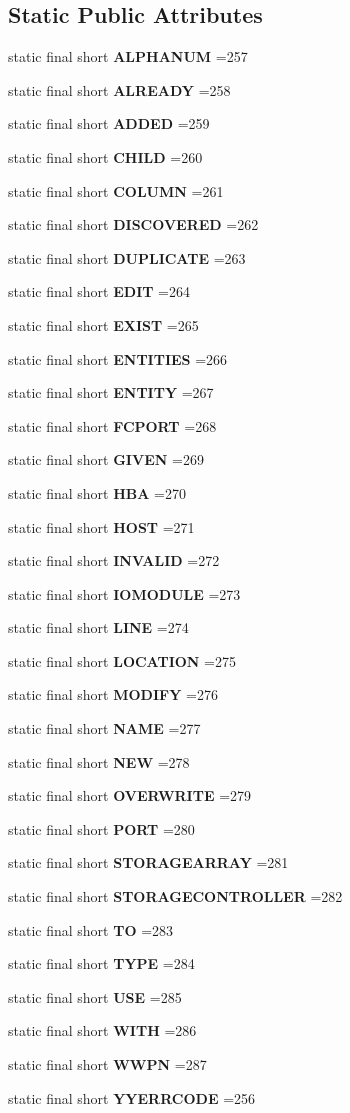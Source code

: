 \subsection*{Static Public Attributes}
\begin{DoxyCompactItemize}
\item 
static final short {\bf A\+L\+P\+H\+A\+N\+U\+M} =257
\item 
static final short {\bf A\+L\+R\+E\+A\+D\+Y} =258
\item 
static final short {\bf A\+D\+D\+E\+D} =259
\item 
static final short {\bf C\+H\+I\+L\+D} =260
\item 
static final short {\bf C\+O\+L\+U\+M\+N} =261
\item 
static final short {\bf D\+I\+S\+C\+O\+V\+E\+R\+E\+D} =262
\item 
static final short {\bf D\+U\+P\+L\+I\+C\+A\+T\+E} =263
\item 
static final short {\bf E\+D\+I\+T} =264
\item 
static final short {\bf E\+X\+I\+S\+T} =265
\item 
static final short {\bf E\+N\+T\+I\+T\+I\+E\+S} =266
\item 
static final short {\bf E\+N\+T\+I\+T\+Y} =267
\item 
static final short {\bf F\+C\+P\+O\+R\+T} =268
\item 
static final short {\bf G\+I\+V\+E\+N} =269
\item 
static final short {\bf H\+B\+A} =270
\item 
static final short {\bf H\+O\+S\+T} =271
\item 
static final short {\bf I\+N\+V\+A\+L\+I\+D} =272
\item 
static final short {\bf I\+O\+M\+O\+D\+U\+L\+E} =273
\item 
static final short {\bf L\+I\+N\+E} =274
\item 
static final short {\bf L\+O\+C\+A\+T\+I\+O\+N} =275
\item 
static final short {\bf M\+O\+D\+I\+F\+Y} =276
\item 
static final short {\bf N\+A\+M\+E} =277
\item 
static final short {\bf N\+E\+W} =278
\item 
static final short {\bf O\+V\+E\+R\+W\+R\+I\+T\+E} =279
\item 
static final short {\bf P\+O\+R\+T} =280
\item 
static final short {\bf S\+T\+O\+R\+A\+G\+E\+A\+R\+R\+A\+Y} =281
\item 
static final short {\bf S\+T\+O\+R\+A\+G\+E\+C\+O\+N\+T\+R\+O\+L\+L\+E\+R} =282
\item 
static final short {\bf T\+O} =283
\item 
static final short {\bf T\+Y\+P\+E} =284
\item 
static final short {\bf U\+S\+E} =285
\item 
static final short {\bf W\+I\+T\+H} =286
\item 
static final short {\bf W\+W\+P\+N} =287
\item 
static final short {\bf Y\+Y\+E\+R\+R\+C\+O\+D\+E} =256
\end{DoxyCompactItemize}
